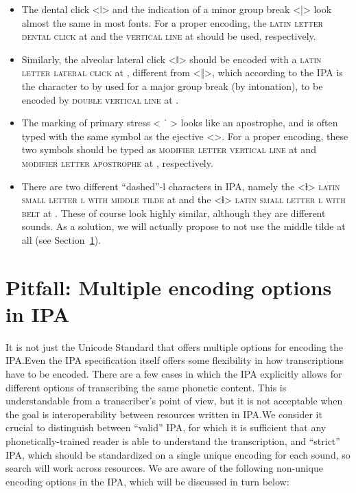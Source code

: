 \begin{itemize}
  
   \item The dental click <ǀ> and the indication of a minor group break <|>
           look almost the same in
           most fonts. For a proper encoding, the \textsc{latin letter dental
           click} at  and the \textsc{vertical line }at  
           should be used, respectively.
   \item Similarly, the alveolar lateral click <ǁ>	should be encoded with a
           \textsc{latin letter lateral click} at , different from <‖>, 
           which according to the IPA is the character to by used for a major group 
           break (by intonation), to be encoded by \textsc{double vertical line} 
           at .
   \item The marking of primary stress < ˈ > looks like an apostrophe, and
           is often typed with the same symbol as the ejective <>. For a
           proper encoding, these two symbols should be typed as 
           \textsc{modifier letter vertical line} at  and
           \textsc{modifier letter apostrophe} at , respectively. 
   \item There are two different ``dashed''-l characters in IPA, namely the <ɫ> 	      \textsc{latin small letter l with middle tilde} at  and the <ɬ>	      \textsc{latin small letter l with belt} at . These of course
          look highly similar, although they are different sounds. As a solution, 
          we will actually propose to not use the middle tilde at all 
          (see Section~\ref{pitfall-multiple-options-ipa}).     
   
\end{itemize}

\section{Pitfall: Multiple encoding options in IPA}
\label{pitfall-multiple-options-ipa}     

It is not just the Unicode Standard that offers multiple options for encoding
the IPA.\@ Even the IPA specification itself offers some flexibility in how
transcriptions have to be encoded. There are a few cases in which the IPA
explicitly allows for different options of transcribing the same phonetic
content. This is understandable from a transcriber's point of view, but it is
not acceptable when the goal is interoperability between resources written in
IPA.\@ We consider it crucial to distinguish between ``valid'' IPA, for which it
is sufficient that any phonetically-trained reader is able to understand the
transcription, and ``strict'' IPA, which should be standardized on a single
unique encoding for each sound, so search will work across resources. We are
aware of the following non-unique encoding options in the IPA, which will be
discussed in turn below:

